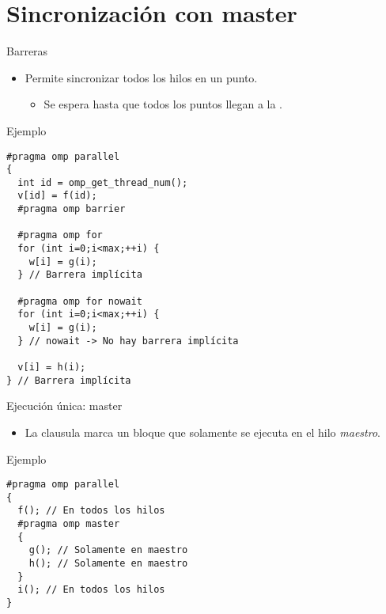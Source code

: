 \section{Sincronización con master}

\begin{frame}[t,fragile]{Barreras}
\begin{itemize}
  \item Permite sincronizar todos los hilos en un punto.
    \begin{itemize}
      \item Se espera hasta que todos los puntos llegan a la .
    \end{itemize}
\end{itemize}
\begin{block}{Ejemplo}
\begin{lstlisting}[basicstyle=\tiny]
#pragma omp parallel
{
  int id = omp_get_thread_num();
  v[id] = f(id);
  #pragma omp barrier

  #pragma omp for
  for (int i=0;i<max;++i) {
    w[i] = g(i);
  } // Barrera implícita

  #pragma omp for nowait
  for (int i=0;i<max;++i) {
    w[i] = g(i);
  } // nowait -> No hay barrera implícita

  v[i] = h(i);
} // Barrera implícita
\end{lstlisting}
\end{block}
\end{frame}

\begin{frame}[t,fragile]{Ejecución única: master}
\begin{itemize}
  \item La clausula  marca un bloque que solamente se ejecuta
        en el hilo \emph{maestro}.
\end{itemize}
\begin{block}{Ejemplo}
\begin{lstlisting}
#pragma omp parallel
{
  f(); // En todos los hilos
  #pragma omp master
  {
    g(); // Solamente en maestro
    h(); // Solamente en maestro
  }
  i(); // En todos los hilos
}
\end{lstlisting}
\end{block}
\end{frame}

